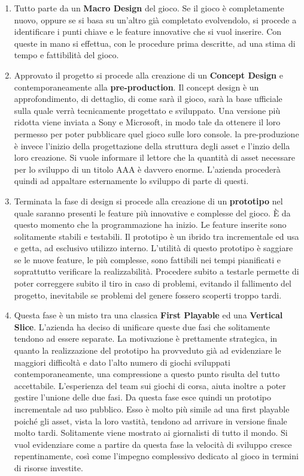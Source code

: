\begin{enumerate}
	\item Tutto parte da un \textbf{Macro Design} del gioco. Se il gioco è completamente nuovo, oppure se si basa su un'altro già completato evolvendolo, si procede a identificare i punti chiave e le feature innovative che si vuol inserire. Con queste in mano si effettua, con le procedure prima descritte, ad una stima di tempo e fattibilità del gioco.
	\item Approvato il progetto si procede alla creazione di un \textbf{Concept Design} e contemporaneamente alla \textbf{pre-production}. Il concept design è un approfondimento, di dettaglio, di come sarà il gioco, sarà la base ufficiale sulla quale verrà tecnicamente progettato e sviluppato. Una versione più ridotta viene inviata a Sony e Microsoft, in modo tale da ottenere il loro permesso per poter pubblicare quel gioco sulle loro console. la pre-produzione è invece l'inizio della progettazione della struttura degli asset e l'inzio della loro creazione. Si vuole informare il lettore che la quantità di asset necessare per lo sviluppo di un titolo \gls{AAA} è davvero enorme. L'azienda procederà quindi ad appaltare esternamente lo sviluppo di parte di questi.
	\item Terminata la fase di design si procede alla creazione di un \textbf{prototipo} nel quale saranno presenti le feature più innovative e complesse del gioco. È da questo momento che la programmazione ha inizio. Le feature inserite sono solitamente stabili e testabili. Il prototipo è un ibrido tra incrementale ed usa e getta, ad esclusivo utilizzo interno. L'utilità di questo prototipo è saggiare se le nuove feature, le più complesse, sono fattibili nei tempi pianificati e soprattutto verificare la realizzabilità. Procedere subito a testarle permette di poter correggere subito il tiro in caso di problemi, evitando il fallimento del progetto, inevitabile se problemi del genere fossero scoperti troppo tardi.
	\item Questa fase è un misto tra una classica \textbf{\gls{First Playable}} ed una \textbf{\gls{Vertical Slice}}. L'azienda ha deciso di unificare queste due fasi che solitamente tendono ad essere separate. La motivazione è prettamente strategica, in quanto la realizzazione del prototipo ha provveduto già ad evidenziare le maggiori difficoltà e dato l'alto numero di giochi sviluppati contemporaneamente, una compressione a questo punto risulta del tutto accettabile. L'esperienza del team sui giochi di corsa, aiuta inoltre a poter gestire l'unione delle due fasi. Da questa fase esce quindi un prototipo incrementale ad uso pubblico. Esso è molto più simile ad una first playable poiché gli asset, vista la loro vastità, tendono ad arrivare in versione finale molto tardi. Solitamente viene mostrato ai giornalisti di tutto il mondo. Si vuol evidenziare come a partire da questa fase la velocità di sviluppo cresce repentinamente, così come l'impegno complessivo dedicato al gioco in termini di risorse investite.

\end{enumerate}
